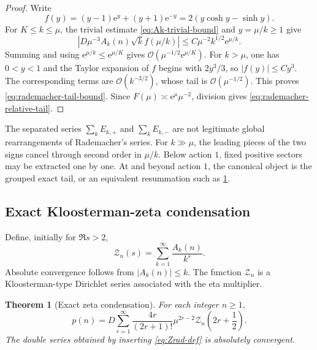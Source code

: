 \documentclass[11pt]{article}
\numberwithin{equation}{section}
\theoremstyle{mainthm}
\newtheorem{theorem}{Theorem}[section]
\theoremstyle{defstyle}
\theoremstyle{remark}
\newcommand{\e}{\mathrm e}
\newcommand{\cO}{\mathcal O}
\newcommand{\abs}[1]{\left|#1\right|}
\newcommand{\Zrad}{\mathcal Z}
\begin{document}
\begin{proof}
Write
\[
 f(y)=(y-1)\e^y+(y+1)\e^{-y}=2(y\cosh y-\sinh y).
\]
For \(K\le k\le\mu\), the trivial estimate \eqref{eq:Ak-trivial-bound} and \(y=\mu/k\ge1\) give
\[
 \abs{D\mu^{-3}A_k(n)\sqrt{k}f(\mu/k)}
 \le C\mu^{-2}k^{1/2}\e^{\mu/k}.
\]
Summing and using \(\e^{\mu/k}\le\e^{\mu/K}\) gives
\(
 \cO(\mu^{-1/2}\e^{\mu/K}).
\)
For \(k>\mu\), one has \(0<y<1\) and the Taylor expansion of \(f\) begins with \(2y^3/3\), so \(|f(y)|\le Cy^3\).  The corresponding terms are \(\cO(k^{-3/2})\), whose tail is \(\cO(\mu^{-1/2})\).  This proves \eqref{eq:rademacher-tail-bound}.  Since \(F(\mu)\asymp\e^\mu\mu^{-2}\), division gives \eqref{eq:rademacher-relative-tail}.
\end{proof}

\begin{warningbox}
The separated series \(\sum_kE_{k,+}\) and \(\sum_kE_{k,-}\) are not legitimate global rearrangements of Rademacher's series.  For \(k\gg\mu\), the leading pieces of the two signs cancel through second order in \(\mu/k\).  Below action \(1\), fixed positive sectors may be extracted one by one.  At and beyond action \(1\), the canonical object is the grouped exact tail, or an equivalent resummation such as \cref{thm:zeta-condensation}.
\end{warningbox}

\subsection{Exact Kloosterman-zeta condensation}

Define, initially for \(\Re s>2\),
\begin{equation}\label{eq:Zrad-def}
 \Zrad_n(s)=\sum_{k=1}^{\infty}\frac{A_k(n)}{k^s}.
\end{equation}
Absolute convergence follows from \(|A_k(n)|\le k\).  The function \(\Zrad_n\) is a Kloosterman-type Dirichlet series associated with the eta multiplier.

\begin{theorem}[Exact zeta condensation]\label{thm:zeta-condensation}
For each integer \(n\ge1\),
\begin{equation}\label{eq:zeta-condensation}
 \boxed{
 p(n)=D\sum_{r=1}^{\infty}
 \frac{4r}{(2r+1)!}\mu^{2r-2}
 \Zrad_n\!\left(2r+\frac12\right).}
\end{equation}
The double series obtained by inserting \eqref{eq:Zrad-def} is absolutely convergent.
\end{theorem}
\end{document}
